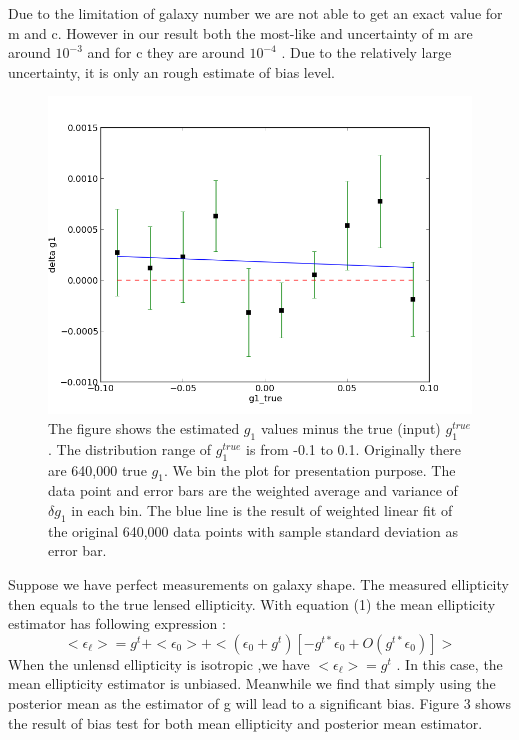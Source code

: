 \documentclass[useAMS,usenatbib]{mn2e}
\begin{document}
Due to the limitation of galaxy number we are not able to get an exact value for m and c. However in our result 
both the most-like and uncertainty of m are around $10^{-3}$ and for c they are around $10^{-4}$ . Due to the
relatively large uncertainty, it is only an rough estimate of bias level.
\begin{figure}
\includegraphics[scale=0.5]{fig/g1bias}

\caption{The figure shows the estimated $g_{1}$ values minus the true (input)
$g_{1}^{true}$. The distribution range of $g_{1}^{true}$ is from
-0.1 to 0.1. Originally there are 640,000 true $g_{1}$. We bin the
plot for presentation purpose. The data point and error bars are the weighted
 average and  variance of $\delta g_{1}$ in each bin. The blue
line is the result of weighted linear fit of the original 640,000 data points
with sample standard deviation as error bar.}
\end{figure}
Suppose we have perfect measurements on galaxy shape. The measured ellipticity then equals to the true lensed ellipticity. With equation (1) the mean ellipticity
estimator has following expression :
\begin{equation}
<\epsilon_{\ell}>=g^{t}+<\epsilon_{0}>+<(\epsilon_{0}+g^{t})[-g^{t*}\epsilon_{0}+O(g^{t*}\epsilon_{0})]>
\end{equation}
When the unlensd ellipticity is isotropic ,we have $<\epsilon_{\ell}>=g^{t}$ . In this case, the mean ellipticity estimator is 
unbiased.
Meanwhile we find that simply using the posterior mean as the estimator of g will lead to a significant bias. 
Figure 3 shows the result of bias test for both mean ellipticity and posterior mean estimator.
\end{document}
